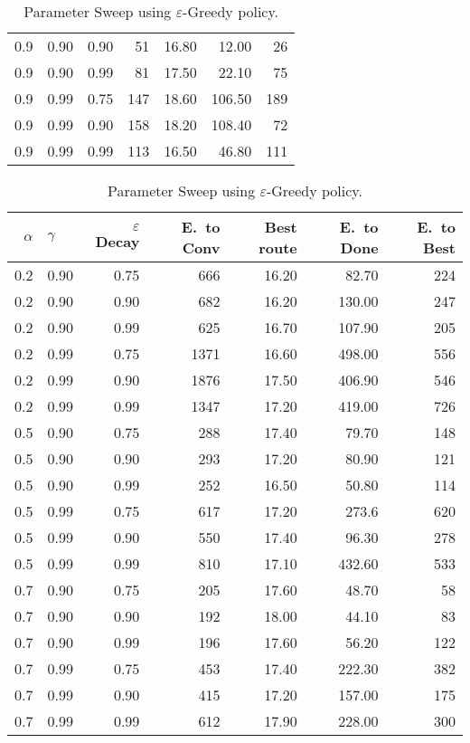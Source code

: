 \begin{table}[h]
\begin{tabular}{r l r | r r r r}
		0.9 & 0.90  & 0.90 & 51  & 16.80 & 12.00  & 26 \\
		0.9 & 0.90  & 0.99 & 81  & 17.50 & 22.10  & 75 \\
		0.9 & 0.99  & 0.75 & 147 & 18.60 & 106.50 & 189 \\
		0.9 & 0.99  & 0.90 & 158 & 18.20 & 108.40 & 72 \\
		0.9 & 0.99  & 0.99 & 113 & 16.50 & 46.80  & 111 \\
		\bottomrule
	\end{tabular}
	\caption{Parameter Sweep using $\varepsilon$-Greedy policy.}
	\vspace{3em}
	\begin{tabular}{r l r | r r r r}
		$\alpha$ & $\gamma$ & $\varepsilon$ Decay &
		E.\ to Conv & Best route & E.\ to Done & E.\ to Best\footnotemark[0]{} \\
		\midrule
			0.2 & 0.90 & 0.75 & 666  & 16.20 &  82.70 &  224 \\
			0.2 & 0.90 & 0.90 & 682  & 16.20 & 130.00 &  247 \\
			0.2 & 0.90 & 0.99 & 625  & 16.70 & 107.90 &  205 \\
			0.2 & 0.99 & 0.75 & 1371 & 16.60 & 498.00 &  556 \\
			0.2 & 0.99 & 0.90 & 1876 & 17.50 & 406.90 &  546 \\
			0.2 & 0.99 & 0.99 & 1347 & 17.20 & 419.00 &  726 \\
			0.5 & 0.90 & 0.75 & 288  & 17.40 &  79.70 &  148 \\
			0.5 & 0.90 & 0.90 & 293  & 17.20 &  80.90 &  121 \\
			0.5 & 0.90 & 0.99 & 252  & 16.50 &  50.80 &  114 \\
			0.5 & 0.99 & 0.75 & 617  & 17.20 &  273.6 &  620 \\
			0.5 & 0.99 & 0.90 & 550  & 17.40 &  96.30 &  278 \\
			0.5 & 0.99 & 0.99 & 810  & 17.10 & 432.60 &  533 \\
			0.7 & 0.90 & 0.75 & 205  & 17.60 &  48.70 &   58 \\
			0.7 & 0.90 & 0.90 & 192  & 18.00 &  44.10 &   83 \\
			0.7 & 0.90 & 0.99 & 196  & 17.60 &  56.20 &  122 \\
			0.7 & 0.99 & 0.75 & 453  & 17.40 & 222.30 &  382 \\
			0.7 & 0.99 & 0.90 & 415  & 17.20 & 157.00 &  175 \\
			0.7 & 0.99 & 0.99 & 612  & 17.90 & 228.00 &  300 \\

\end{tabular}
\end{table}
